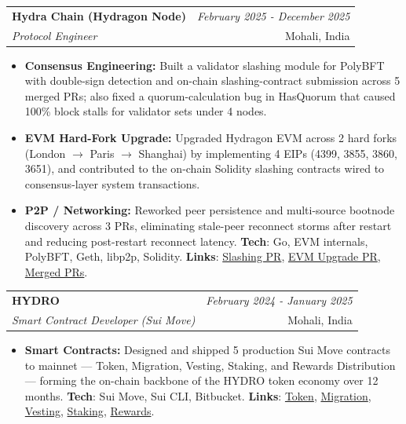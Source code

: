 \documentclass[a4paper,11pt]{article}
\makeatletter
\newcommand{\resumeItem}[2]{
  \item{
    \textbf{#1}{\hspace{0.5mm}#2 \vspace{-0.5mm}}
  }
}
\newcommand{\resumeSubheading}[4]{
\vspace{0.5mm}\item
    \begin{tabular*}{0.98\textwidth}[t]{l@{\extracolsep{\fill}}r}
        \textbf{#1} & \textit{\footnotesize{#4}} \\
        \textit{\footnotesize{#3}} &  \footnotesize{#2}\\
    \end{tabular*}
    \vspace{-2.4mm}
}
\newcommand{\resumeItemListStart}{\begin{itemize}[leftmargin=*,labelsep=1mm,itemsep=0.5mm]}
\newcommand{\resumeItemListEnd}{\end{itemize}\vspace{-2mm}}
\makeatother
\begin{document}
  \resumeSubheading
      {Hydra Chain (Hydragon Node)}{Mohali, India}
      {Protocol Engineer}{February 2025 - December 2025}
      \resumeItemListStart
        \resumeItem{Consensus Engineering: }{Built a validator slashing module for PolyBFT with double-sign detection and on-chain slashing-contract submission across 5 merged PRs; also fixed a quorum-calculation bug in HasQuorum that caused 100\% block stalls for validator sets under 4 nodes.}
        \resumeItem{EVM Hard-Fork Upgrade: }{Upgraded Hydragon EVM across 2 hard forks (London $\rightarrow$ Paris $\rightarrow$ Shanghai) by implementing 4 EIPs (4399, 3855, 3860, 3651), and contributed to the on-chain Solidity slashing contracts wired to consensus-layer system transactions.}
        \resumeItem{P2P / Networking: }{Reworked peer persistence and multi-source bootnode discovery across 3 PRs, eliminating stale-peer reconnect storms after restart and reducing post-restart reconnect latency.}\newline
        \textbf{Tech}: Go, EVM internals, PolyBFT, Geth, libp2p, Solidity. \textbf{Links}: \href{https://github.com/Hydra-Chain/hydragon-node/pull/122}{Slashing PR}, \href{https://github.com/Hydra-Chain/hydragon-node/pull/123}{EVM Upgrade PR}, \href{https://github.com/Hydra-Chain/hydragon-node/pulls?q=is\%3Apr+author\%3AAmit22-yadav+is\%3Aclosed}{Merged PRs}.
      \resumeItemListEnd


  \resumeSubheading
      {HYDRO}{Mohali, India}
      {Smart Contract Developer (Sui Move)}{February 2024 - January 2025}
      \resumeItemListStart
        \resumeItem{Smart Contracts: }{Designed and shipped 5 production Sui Move contracts to mainnet — Token, Migration, Vesting, Staking, and Rewards Distribution — forming the on-chain backbone of the HYDRO token economy over 12 months.}\newline
        \textbf{Tech}: Sui Move, Sui CLI, Bitbucket. \textbf{Links}: \href{https://suiscan.xyz/mainnet/object/0x4bb07b086c13bda7af26b9872fa8c4b460a9c0479cde6a63de4b9d29ea0ec99a/contracts}{Token}, \href{https://suiscan.xyz/mainnet/object/0xbfa32851690179e9576df04d932108040ca585f5c9ee487908b5ae92466367a8/contracts}{Migration}, \href{https://suiscan.xyz/mainnet/object/0xcee7a9493802ad54cd28411c69158cb21d7fb945b39d608a1cf989670d8ed4b0/contracts}{Vesting}, \href{https://suiscan.xyz/mainnet/object/0x123fc385b4d17d0cfe9d9f561dd475b163db6f91fbb7481af5019fe3032baa6c/contracts}{Staking}, \href{https://suiscan.xyz/mainnet/object/0x9ab7bdf99a40beb91835b6d948d13ffef96b1c10cc2b026b03512fdad3b46ebc/contracts}{Rewards}.
      \resumeItemListEnd
\end{document}
